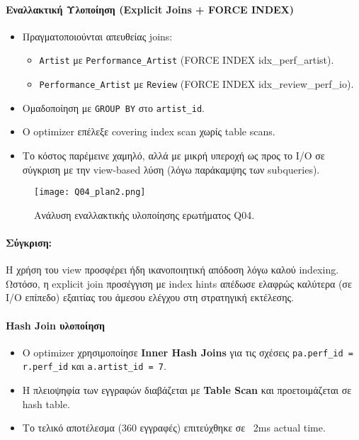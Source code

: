 \documentclass[13pt]{extarticle}
\begin{document}
\paragraph{Εναλλακτική Υλοποίηση (Explicit Joins + FORCE INDEX)}
\begin{itemize}
    \item Πραγματοποιούνται απευθείας joins:
    \begin{itemize}
        \item \texttt{Artist} με \texttt{Performance\_Artist} (FORCE INDEX idx\_perf\_artist).
        \item \texttt{Performance\_Artist} με \texttt{Review} (FORCE INDEX idx\_review\_perf\_io).
    \end{itemize}
    \item Ομαδοποίηση με \texttt{GROUP BY} στο \texttt{artist\_id}.
    \item Ο optimizer επέλεξε covering index scan χωρίς table scans.
    \item Το κόστος παρέμεινε χαμηλό, αλλά με μικρή υπεροχή ως προς το I/O σε σύγκριση με την view-based λύση (λόγω παράκαμψης των subqueries).
\end{itemize}

\begin{figure}[H]
    \centering
    \texttt{[image: Q04\_plan2.png]}
    \caption{Ανάλυση εναλλακτικής υλοποίησης ερωτήματος Q04.}
\end{figure}

\paragraph{Σύγκριση:}  
Η χρήση του view προσφέρει ήδη ικανοποιητική απόδοση λόγω καλού indexing. Ωστόσο, η explicit join προσέγγιση με index hints απέδωσε ελαφρώς καλύτερα (σε I/O επίπεδο) εξαιτίας του άμεσου ελέγχου στη στρατηγική εκτέλεσης.

\paragraph{Hash Join υλοποίηση}
\begin{itemize}
    \item Ο optimizer χρησιμοποίησε \textbf{Inner Hash Joins} για τις σχέσεις \texttt{pa.perf\_id = r.perf\_id} και \texttt{a.artist\_id = 7}.
    \item Η πλειοψηφία των εγγραφών διαβάζεται με \textbf{Table Scan} και προετοιμάζεται σε hash table.
    \item Το τελικό αποτέλεσμα (360 εγγραφές) επιτεύχθηκε σε ~2ms actual time.
\end{itemize}
\end{document}
